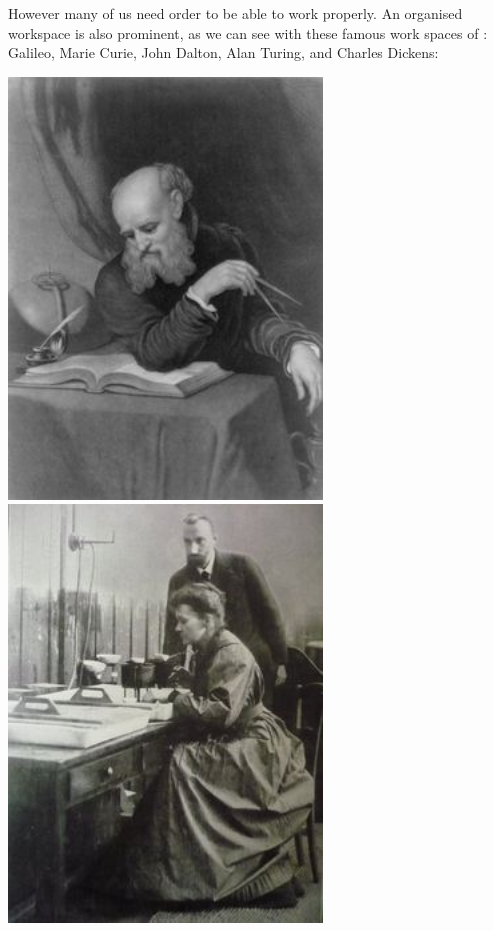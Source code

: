 \documentclass[]{book}
\theoremstyle{definition}
\theoremstyle{definition}
\theoremstyle{definition}
\theoremstyle{remark}
\begin{document}
However many of us need order to be able to work properly. An organised
workspace is also prominent, as we can see with these famous work spaces
of : Galileo, Marie Curie, John Dalton, Alan Turing, and Charles
Dickens:

\includegraphics[width=3.28in]{imgs/galileo_desk}
\includegraphics[width=3.28in]{imgs/marie_curie}
\end{document}
